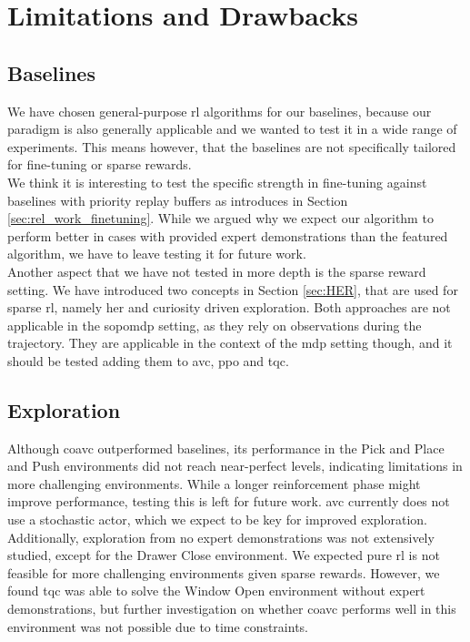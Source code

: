 \section{Limitations and Drawbacks}
\subsection{Baselines}
We have chosen general-purpose \ac{rl} algorithms for our baselines, because our paradigm is also generally applicable 
and we wanted to test it in a wide range of experiments. This means however, that the baselines are not specifically tailored for fine-tuning or sparse rewards.\\ 

We think it is interesting to test the specific strength in fine-tuning against baselines with priority replay buffers as introduces in Section \ref{sec:rel_work_finetuning}. 
While we argued why we expect our algorithm to perform better in cases with provided expert demonstrations than the featured algorithm, we have to 
leave testing it for future work.\\

Another aspect that we have not tested in more depth is the sparse reward setting. We have introduced two concepts in Section \ref{sec:HER}, that are used for sparse \ac{rl}, namely 
\ac{her} and curiosity driven exploration. Both approaches are not applicable in the \ac{sopomdp} setting, as they rely on observations during the trajectory. 
They are applicable in the context of the \ac{mdp} setting though, and it should be tested adding them to \ac{avc}, \ac{ppo} and \ac{tqc}.

\subsection{Exploration}
Although \ac{coavc} outperformed baselines, its performance in the Pick and Place and Push environments did not reach near-perfect levels, 
indicating limitations in more challenging environments. While a longer reinforcement phase might improve performance, testing this is left for 
future work. \ac{avc} currently does not use a stochastic actor, which we expect to be key for improved exploration.\\ 

Additionally, exploration from no expert demonstrations was not extensively studied, except for the Drawer Close 
environment. We expected pure \ac{rl} is not feasible for more challenging environments given sparse rewards. 
However, we found \ac{tqc} was able to solve the Window Open environment without expert demonstrations, but further investigation on whether 
\ac{coavc} performs well in this environment was not possible due to time constraints.\\ 

